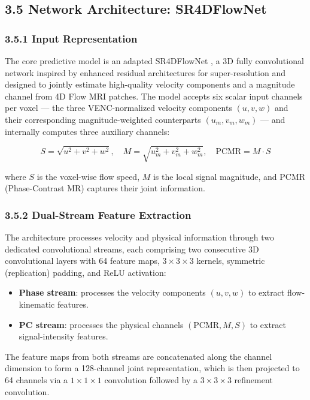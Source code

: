 \documentclass[11pt]{article}
\begin{document}
\subsection*{3.5 Network Architecture: SR4DFlowNet}

\subsubsection*{3.5.1 Input Representation}

The core predictive model is an adapted SR4DFlowNet \cite{ferdian2020,elahmar2023}, a 3D fully convolutional network inspired by enhanced residual architectures for super-resolution \cite{lim2017edsr} and designed to jointly estimate high-quality velocity components and a magnitude channel from 4D Flow MRI patches. The model accepts six scalar input channels per voxel --- the three VENC-normalized velocity components $(u, v, w)$ and their corresponding magnitude-weighted counterparts $(u_m, v_m, w_m)$ --- and internally computes three auxiliary channels:

\begin{equation}
    S = \sqrt{u^2 + v^2 + w^2}, \quad
    M = \sqrt{u_m^2 + v_m^2 + w_m^2}, \quad
    \text{PCMR} = M \cdot S
\end{equation}

where $S$ is the voxel-wise flow speed, $M$ is the local signal magnitude, and PCMR (Phase-Contrast MR) captures their joint information.

\subsubsection*{3.5.2 Dual-Stream Feature Extraction}

The architecture processes velocity and physical information through two dedicated convolutional streams, each comprising two consecutive 3D convolutional layers with 64 feature maps, $3\times3\times3$ kernels, symmetric (replication) padding, and ReLU activation:

\begin{itemize}
    \item \textbf{Phase stream}: processes the velocity components $(u, v, w)$ to extract flow-kinematic features.
    \item \textbf{PC stream}: processes the physical channels $(\text{PCMR}, M, S)$ to extract signal-intensity features.
\end{itemize}

The feature maps from both streams are concatenated along the channel dimension to form a 128-channel joint representation, which is then projected to 64 channels via a $1\times1\times1$ convolution followed by a $3\times3\times3$ refinement convolution.
\end{document}

